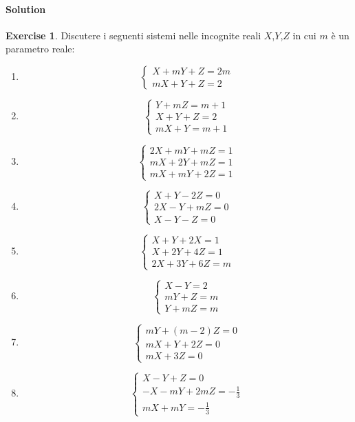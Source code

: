 \documentclass{article}
\theoremstyle{plain}
\theoremstyle{definition}
\newtheorem{xca}[exmp]{Exercise}
\theoremstyle{remark}
\begin{document}
\paragraph{Solution}
\begin{xca}
    Discutere i seguenti sistemi nelle incognite reali $X$,$Y$,$Z$ in cui $m$ è un parametro reale:
    \begin{enumerate}
        \item \[\begin{cases}
            X+mY+Z=2m\\
            mX+Y+Z=2
        \end{cases}\]
        \item \[\begin{cases}
            Y+mZ=m+1\\
            X+Y+Z=2\\
            mX+Y=m+1
        \end{cases}\]
        \item \[\begin{cases}
            2X+mY+mZ=1\\
            mX+2Y+mZ=1\\
            mX+mY+2Z=1
        \end{cases}\]
        \item \[\begin{cases}
            X+Y-2Z=0\\
            2X-Y+mZ=0\\
            X-Y-Z=0
        \end{cases}\]
        \item \[\begin{cases}
            X+Y+2X=1\\
            X+2Y+4Z=1\\
            2X+3Y+6Z=m
        \end{cases}\]
        \item \[\begin{cases}
            X-Y=2\\
            mY+Z=m\\
            Y+mZ=m
        \end{cases}\]
        \item \[\begin{cases}
            mY+(m-2)Z=0\\
            mX+Y+2Z=0\\
            mX+3Z=0
        \end{cases}\]
        \item \[\begin{cases}
            X-Y+Z=0\\
            -X-mY+2mZ=-\frac{1}{3}\\
            mX+mY=-\frac{1}{3}
        \end{cases}\]
    \end{enumerate}
\end{xca}
\end{document}
